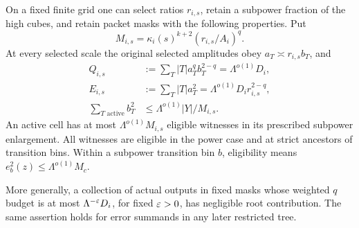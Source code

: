 \begin{lemma}\label{f:selection}
On a fixed finite grid one can select ratios $r_{i,s}$, retain a
subpower fraction of the high cubes, and retain packet masks with the
following properties. Put
\begin{equation}\label{f:occupancy-size}
 M_{i,s}=\kappa_i(s)^{k+2}(r_{i,s}/A_i)^q.
\end{equation}
At every selected scale the original selected amplitudes obey
$a_T\asymp r_{i,s}b_T$, and
\begin{align}
 Q_{i,s}&:=\sum_T|T|a_T^qb_T^{2-q}=\Lambda^{o(1)}D_i,
                                                        \label{f:Qsat}\\
 E_{i,s}&:=\sum_T|T|a_T^2=\Lambda^{o(1)}D_ir_{i,s}^{2-q},
                                                        \label{f:Esat}\\
 \sum_{T\text{ active}}b_T^2&\le
             \Lambda^{o(1)}|Y|/M_{i,s}.                  \label{f:Bcharge}
\end{align}
An active cell has at most $\Lambda^{o(1)}M_{i,s}$ eligible witnesses
in its prescribed subpower enlargement. All witnesses are eligible in
the power case and at strict ancestors of transition bins. Within a
subpower transition bin $b$, eligibility means
$e_b^2(z)\le\Lambda^{o(1)}M_c$.

More generally, a collection of actual outputs in fixed masks whose
weighted $q$ budget is at most $\Lambda^{-\varepsilon}D_i$, for fixed
$\varepsilon>0$, has negligible root contribution. The same assertion holds
for error summands in any later restricted tree.
\end{lemma}

